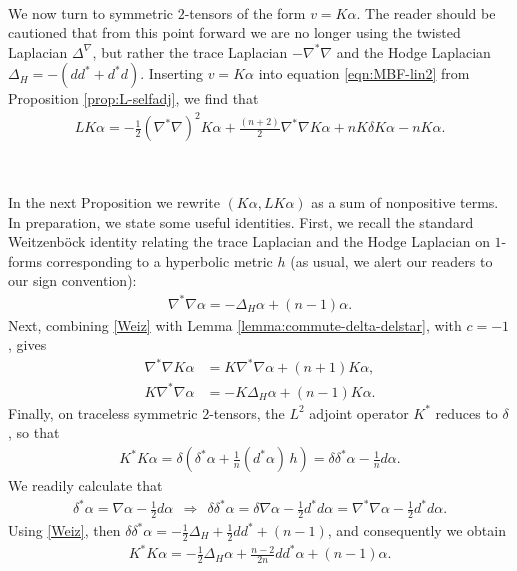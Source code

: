 \documentclass[10pt,reqno]{amsart}
\begin{document}
\

We now turn to symmetric $2$-tensors of the form $v = K \alpha$.  The reader should be cautioned that from this point forward
we are no longer using the twisted Laplacian $\Delta^\nabla$, but rather the trace Laplacian $-\nabla^*\nabla$ and the Hodge
Laplacian $\Delta_H = -(d d^* + d^* d)$.  Inserting $v = K \alpha$ into equation \eqref{eqn:MBF-lin2} from  Proposition \ref{prop:L-selfadj}, 
we find that 
\begin{align}
\label{eqn:LKalpha}
L K \alpha = -\frac{1}{2} (\nabla^*\nabla )^2 K \alpha + \frac{(n+2)}{2} \nabla^*\nabla K \alpha + n K \delta K \alpha - n K \alpha.
\end{align}

\

In the next Proposition we rewrite $(K \alpha, L K\alpha)$ as a sum of nonpositive terms. In preparation, we state some useful identities.
First, we recall the standard Weitzenb\"ock identity relating the trace Laplacian and the Hodge Laplacian on $1$-forms corresponding to a hyperbolic metric 
$h$ (as usual, we alert our readers to our sign convention):
\begin{align}
\nabla^*\nabla \alpha = - \Delta_H \alpha + (n-1) \alpha. 
\label{Weiz}
\end{align}
Next, combining \eqref{Weiz} with Lemma \ref{lemma:commute-delta-delstar}, with $c = -1$, gives
\begin{align}
\nabla^* \nabla  K \alpha & =  K \nabla^*\nabla \alpha + (n+1) K \alpha,  \nonumber \\
K \nabla^* \nabla \alpha & = -K \Delta_H \alpha + (n-1) K \alpha.
\label{110}
\end{align}
Finally, on traceless symmetric $2$-tensors, the $L^2$ adjoint operator $K^*$ reduces to $\delta$, so that
\begin{align*}
K^* K \alpha = \delta ( \delta^* \alpha + \frac{1}{n} (d^* \alpha)\, h) = \delta \delta^* \alpha - \frac{1}{n} d\alpha.
\end{align*}
We readily calculate that 
\begin{align}
\delta^*\alpha = \nabla \alpha - \frac12 d\alpha \ \ \Longrightarrow \ \ \delta \delta^*\alpha = \delta \nabla \alpha - \frac12 d^* d \alpha = \nabla^*\nabla \alpha - \frac12 d^* d\alpha.
\label{inter}
\end{align}
Using \eqref{Weiz}, then $\delta \delta^* \alpha = -\frac12 \Delta_H + \frac12 d d^* + (n-1)$, and consequently we obtain
\begin{align}
K^* K \alpha = -\frac12 \Delta_H \alpha + \frac{n-2}{2n} dd^* \alpha + (n-1)\alpha.
\label{111}
\end{align}
\end{document}
